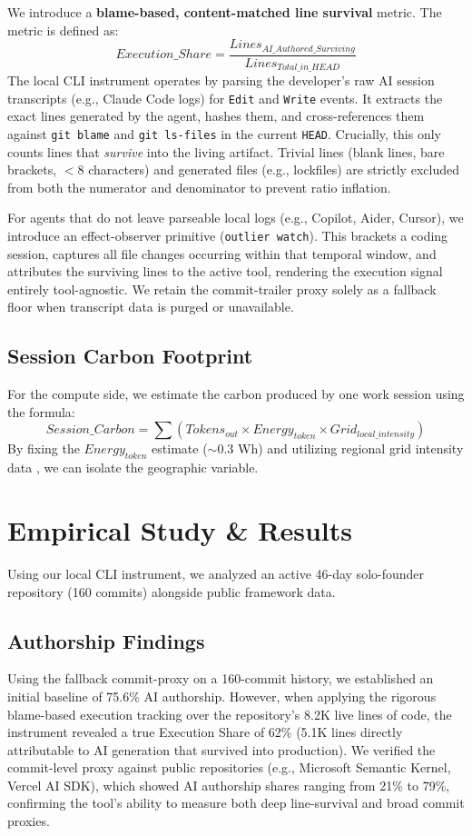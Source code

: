 \documentclass[11pt,a4paper]{article}
\begin{document}
We introduce a \textbf{blame-based, content-matched line survival} metric. The metric is defined as:
\begin{equation}
Execution\_Share = \frac{Lines_{AI\_Authored\_Surviving}}{Lines_{Total\_in\_HEAD}}
\end{equation}
The local CLI instrument operates by parsing the developer's raw AI session transcripts (e.g., Claude Code logs) for \texttt{Edit} and \texttt{Write} events. It extracts the exact lines generated by the agent, hashes them, and cross-references them against \texttt{git blame} and \texttt{git ls-files} in the current \texttt{HEAD}. Crucially, this only counts lines that \textit{survive} into the living artifact. Trivial lines (blank lines, bare brackets, $<$8 characters) and generated files (e.g., lockfiles) are strictly excluded from both the numerator and denominator to prevent ratio inflation.

For agents that do not leave parseable local logs (e.g., Copilot, Aider, Cursor), we introduce an effect-observer primitive (\texttt{outlier watch}). This brackets a coding session, captures all file changes occurring within that temporal window, and attributes the surviving lines to the active tool, rendering the execution signal entirely tool-agnostic. We retain the commit-trailer proxy solely as a fallback floor when transcript data is purged or unavailable.

\subsection{Session Carbon Footprint}
For the compute side, we estimate the carbon produced by one work session using the formula:
\begin{equation}
Session\_Carbon = \sum (Tokens_{out} \times Energy_{token} \times Grid_{local\_intensity})
\end{equation}
By fixing the $Energy_{token}$ estimate ($\sim$0.3 Wh) and utilizing regional grid intensity data \cite{hust2024, rte2024}, we can isolate the geographic variable.

\section{Empirical Study \& Results}
Using our local CLI instrument, we analyzed an active 46-day solo-founder repository (160 commits) alongside public framework data.

\subsection{Authorship Findings}
Using the fallback commit-proxy on a 160-commit history, we established an initial baseline of 75.6\% AI authorship. However, when applying the rigorous blame-based execution tracking over the repository's 8.2K live lines of code, the instrument revealed a true Execution Share of 62\% (5.1K lines directly attributable to AI generation that survived into production). We verified the commit-level proxy against public repositories (e.g., Microsoft Semantic Kernel, Vercel AI SDK), which showed AI authorship shares ranging from 21\% to 79\%, confirming the tool's ability to measure both deep line-survival and broad commit proxies.
\end{document}
